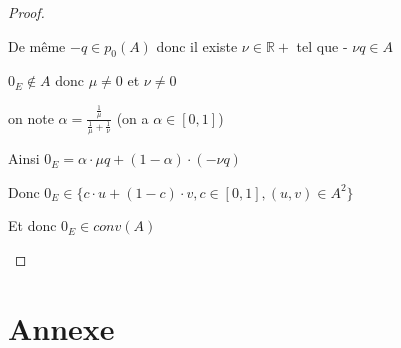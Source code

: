 \documentclass[a4paper]{article}
\begin{document}
\begin{proof}
\begin{itemize}
    De même $-q \in p_{0}(A)$ donc il existe $\nu \in \mathbb{R}+$ tel que - $\nu q \in A$

    $0_{E} \notin A$ donc $\mu \neq 0$ et $\nu \neq 0$

    on note $\alpha = \frac{\frac{1}{\mu}}{\frac{1}{\mu} + \frac{1}{\nu}}$ (on a $\alpha \in [0, 1]$)

    Ainsi $0_{E} = \alpha \cdot \mu q + (1 - \alpha) \cdot (- \nu  q)$

    Donc $0_{E} \in \{c \cdot u + (1 - c) \cdot v, c \in [0, 1], (u, v) \in A^{2} \}$


    Et donc $0_{E} \in conv(A)$
    \end{itemize}
    \end{proof}
  \section{Annexe}\label{AnnexeC}
    \inputminted{python}{wep.py}
\end{document}
